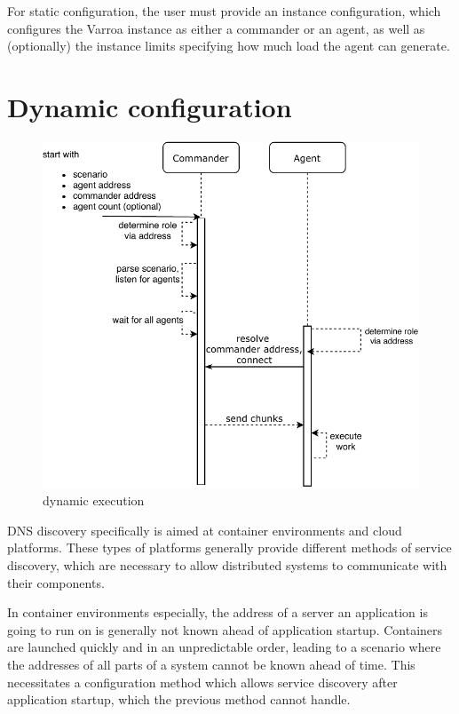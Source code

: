 For static configuration, the user must provide an instance configuration, which configures the Varroa instance as either a commander or an agent, as well as (optionally) the instance limits specifying how much load the agent can generate.

\section{Dynamic configuration}

\begin{figure}[h]
\begin{center}
\includegraphics[scale=0.65]{Resources/PDF/ExecutionDnsInit}
\caption{dynamic execution}
\end{center}
\end{figure}

DNS discovery specifically is aimed at container environments and cloud platforms. These types of platforms generally provide different methods of service discovery, which are necessary to allow distributed systems to communicate with their components.

In container environments especially, the address of a server an application is going to run on is generally not known ahead of application startup. Containers are launched quickly and in an unpredictable order, leading to a scenario where the addresses of all parts of a system cannot be known ahead of time. This necessitates a configuration method which allows service discovery after application startup, which the previous method cannot handle.

